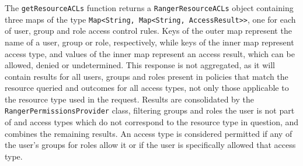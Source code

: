 The \texttt{getResourceACLs} function returns a \texttt{RangerResourceACLs} object containing three maps of the type \texttt{Map<String, Map<String, AccessResult>>}, one for each of user, group and role access control rules. Keys of the outer map represent the name of a user, group or role, respectively, while keys of the inner map represent access type, and values of the inner map represent an access result, which can be allowed, denied or undetermined. This response is not aggregated, as it will contain results for all users, groups and roles present in policies that match the resource queried and outcomes for all access types, not only those applicable to the resource type used in the request. Results are consolidated by the \texttt{RangerPermissionsProvider} class, filtering groups and roles the user is not part of and access types which do not correspond to the resource type in question, and combines the remaining results. An access type is considered permitted if any of the user's groups for roles allow it or if the user is specifically allowed that access type.
